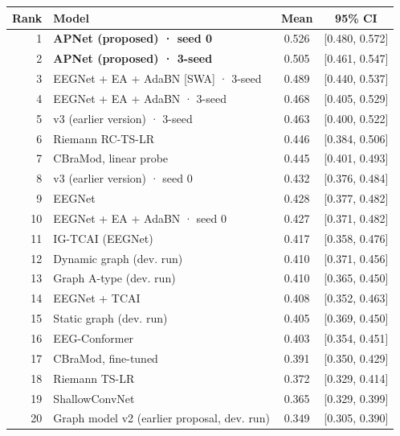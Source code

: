 \begin{tabular}{rlcc}
\hline
Rank & Model & Mean & 95\% CI \\
\hline
1 & \textbf{APNet (proposed) · seed 0} & 0.526 & [0.480, 0.572] \\
2 & \textbf{APNet (proposed) · 3-seed} & 0.505 & [0.461, 0.547] \\
3 & EEGNet + EA + AdaBN [SWA] · 3-seed & 0.489 & [0.440, 0.537] \\
4 & EEGNet + EA + AdaBN · 3-seed & 0.468 & [0.405, 0.529] \\
5 & v3 (earlier version) · 3-seed & 0.463 & [0.400, 0.522] \\
6 & Riemann RC-TS-LR & 0.446 & [0.384, 0.506] \\
7 & CBraMod, linear probe & 0.445 & [0.401, 0.493] \\
8 & v3 (earlier version) · seed 0 & 0.432 & [0.376, 0.484] \\
9 & EEGNet & 0.428 & [0.377, 0.482] \\
10 & EEGNet + EA + AdaBN · seed 0 & 0.427 & [0.371, 0.482] \\
11 & IG-TCAI (EEGNet) & 0.417 & [0.358, 0.476] \\
12 & Dynamic graph (dev. run) & 0.410 & [0.371, 0.456] \\
13 & Graph A-type (dev. run) & 0.410 & [0.365, 0.450] \\
14 & EEGNet + TCAI & 0.408 & [0.352, 0.463] \\
15 & Static graph (dev. run) & 0.405 & [0.369, 0.450] \\
16 & EEG-Conformer & 0.403 & [0.354, 0.451] \\
17 & CBraMod, fine-tuned & 0.391 & [0.350, 0.429] \\
18 & Riemann TS-LR & 0.372 & [0.329, 0.414] \\
19 & ShallowConvNet & 0.365 & [0.329, 0.399] \\
20 & Graph model v2 (earlier proposal, dev. run) & 0.349 & [0.305, 0.390] \\
\hline
\end{tabular}
